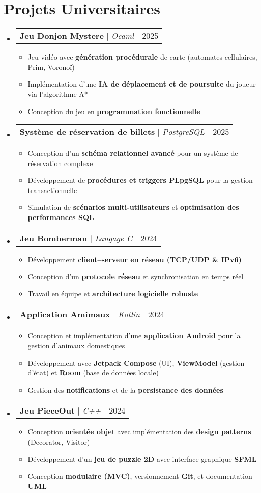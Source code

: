 \documentclass[letterpaper,11pt]{article}
\makeatletter
\newcommand{\resumeItem}[1]{
  \item\small{
    {#1 \vspace{-2pt}}
  }
}
\newcommand{\resumeProjectHeading}[2]{
    \item
    \begin{tabular*}{0.97\textwidth}{l@{\extracolsep{\fill}}r}
      \small#1 & #2 \\
    \end{tabular*}\vspace{-7pt}
}
\newcommand{\resumeSubHeadingListStart}{\begin{itemize}[leftmargin=0.15in, label={}]}
\newcommand{\resumeSubHeadingListEnd}{\end{itemize}}
\newcommand{\resumeItemListStart}{\begin{itemize}}
\newcommand{\resumeItemListEnd}{\end{itemize}\vspace{-5pt}}
\makeatother
\begin{document}
\section{Projets Universitaires}
    \resumeSubHeadingListStart
      \resumeProjectHeading
          {\textbf{Jeu Donjon Mystere} $|$ \emph{Ocaml}}{2025}
          \resumeItemListStart
            \resumeItem{Jeu vidéo avec \textbf{génération procédurale} de carte (automates cellulaires, Prim, Voronoï)}
            \resumeItem{Implémentation d’une \textbf{IA de déplacement et de poursuite} du joueur via l’algorithme A*}
            \resumeItem{Conception du jeu en \textbf{programmation fonctionnelle}}
          \resumeItemListEnd
      \resumeProjectHeading
          {\textbf{Système de réservation de billets} $|$ \emph{PostgreSQL}}{2025}
          \resumeItemListStart
            \resumeItem{Conception d’un \textbf{schéma relationnel avancé} pour un système de réservation complexe}
            \resumeItem{Développement de \textbf{procédures et triggers PLpgSQL} pour la gestion transactionnelle}
            \resumeItem{Simulation de \textbf{scénarios multi-utilisateurs} et \textbf{optimisation des performances SQL}}
          \resumeItemListEnd
      \resumeProjectHeading
          {\textbf{Jeu Bomberman} $|$ \emph{Langage C}}{2024}
          \resumeItemListStart
            \resumeItem{Développement \textbf{client–serveur en réseau (TCP/UDP & IPv6)}}
            \resumeItem{Conception d’un \textbf{protocole réseau} et synchronisation en temps réel}
            \resumeItem{Travail en équipe et \textbf{architecture logicielle robuste}}
          \resumeItemListEnd
      \resumeProjectHeading
          {\textbf{Application Amimaux} $|$ \emph{Kotlin}}{2024}
          \resumeItemListStart
            \resumeItem{Conception et implémentation d’une \textbf{application Android} pour la gestion d’animaux domestiques}
            \resumeItem{Développement avec \textbf{Jetpack Compose} (UI), \textbf{ViewModel} (gestion d’état) et \textbf{Room} (base de données locale)}
            \resumeItem{Gestion des \textbf{notifications} et de la \textbf{persistance des données}}
          \resumeItemListEnd
      \resumeProjectHeading
          {\textbf{Jeu PieceOut} $|$ \emph{C++}}{2024}
          \resumeItemListStart
            \resumeItem{Conception \textbf{orientée objet} avec implémentation des \textbf{design patterns} (Decorator, Visitor)}
            \resumeItem{Développement d’un \textbf{jeu de puzzle 2D} avec interface graphique \textbf{SFML}}
            \resumeItem{Conception \textbf{modulaire (MVC)}, versionnement \textbf{Git}, et documentation \textbf{UML}}
          \resumeItemListEnd
    \resumeSubHeadingListEnd
\end{document}
